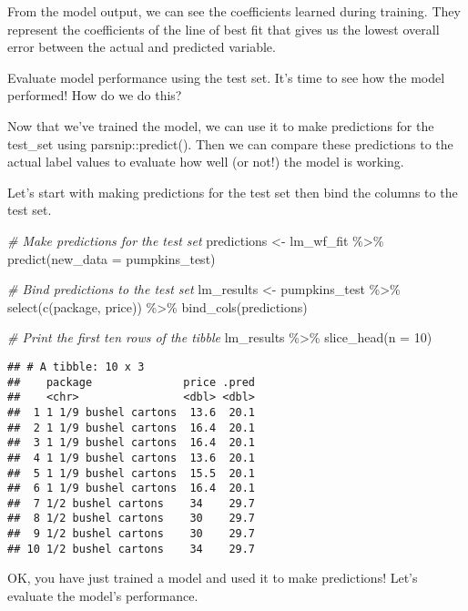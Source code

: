 \documentclass[
]{article}
\newenvironment{Shaded}{\begin{snugshade}}{\end{snugshade}}
\newcommand{\AttributeTok}[1]{\textcolor[rgb]{0.77,0.63,0.00}{#1}}
\newcommand{\CommentTok}[1]{\textcolor[rgb]{0.56,0.35,0.01}{\textit{#1}}}
\newcommand{\DecValTok}[1]{\textcolor[rgb]{0.00,0.00,0.81}{#1}}
\newcommand{\FunctionTok}[1]{\textcolor[rgb]{0.00,0.00,0.00}{#1}}
\newcommand{\NormalTok}[1]{#1}
\newcommand{\OtherTok}[1]{\textcolor[rgb]{0.56,0.35,0.01}{#1}}
\newcommand{\SpecialCharTok}[1]{\textcolor[rgb]{0.00,0.00,0.00}{#1}}
\begin{document}
From the model output, we can see the coefficients learned during
training. They represent the coefficients of the line of best fit that
gives us the lowest overall error between the actual and predicted
variable.

Evaluate model performance using the test set. It's time to see how the
model performed! How do we do this?

Now that we've trained the model, we can use it to make predictions for
the test\_set using parsnip::predict(). Then we can compare these
predictions to the actual label values to evaluate how well (or not!)
the model is working.

Let's start with making predictions for the test set then bind the
columns to the test set.

\begin{Shaded}
\begin{Highlighting}[]
\CommentTok{\# Make predictions for the test set}
\NormalTok{predictions }\OtherTok{\textless{}{-}}\NormalTok{ lm\_wf\_fit }\SpecialCharTok{\%\textgreater{}\%} 
  \FunctionTok{predict}\NormalTok{(}\AttributeTok{new\_data =}\NormalTok{ pumpkins\_test)}


\CommentTok{\# Bind predictions to the test set}
\NormalTok{lm\_results }\OtherTok{\textless{}{-}}\NormalTok{ pumpkins\_test }\SpecialCharTok{\%\textgreater{}\%} 
  \FunctionTok{select}\NormalTok{(}\FunctionTok{c}\NormalTok{(package, price)) }\SpecialCharTok{\%\textgreater{}\%} 
  \FunctionTok{bind\_cols}\NormalTok{(predictions)}


\CommentTok{\# Print the first ten rows of the tibble}
\NormalTok{lm\_results }\SpecialCharTok{\%\textgreater{}\%} 
  \FunctionTok{slice\_head}\NormalTok{(}\AttributeTok{n =} \DecValTok{10}\NormalTok{)}
\end{Highlighting}
\end{Shaded}

\begin{verbatim}
## # A tibble: 10 x 3
##    package              price .pred
##    <chr>                <dbl> <dbl>
##  1 1 1/9 bushel cartons  13.6  20.1
##  2 1 1/9 bushel cartons  16.4  20.1
##  3 1 1/9 bushel cartons  16.4  20.1
##  4 1 1/9 bushel cartons  13.6  20.1
##  5 1 1/9 bushel cartons  15.5  20.1
##  6 1 1/9 bushel cartons  16.4  20.1
##  7 1/2 bushel cartons    34    29.7
##  8 1/2 bushel cartons    30    29.7
##  9 1/2 bushel cartons    30    29.7
## 10 1/2 bushel cartons    34    29.7
\end{verbatim}

OK, you have just trained a model and used it to make predictions! Let's
evaluate the model's performance.
\end{document}
